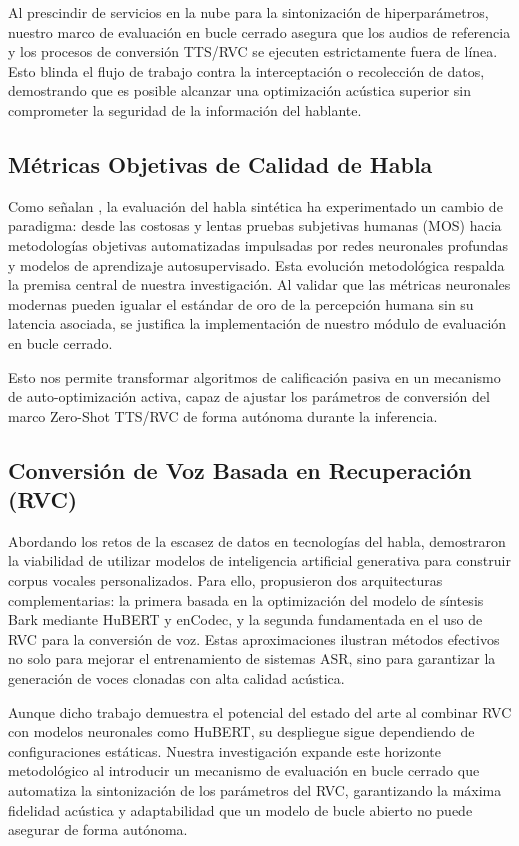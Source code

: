 \documentclass[conference]{IEEEtran}
\begin{document}
Al prescindir de servicios en la nube para la sintonización de hiperparámetros, nuestro marco de evaluación en bucle cerrado asegura que los audios de referencia y los procesos de conversión TTS/RVC se ejecuten estrictamente fuera de línea. Esto blinda el flujo de trabajo contra la interceptación o recolección de datos, demostrando que es posible alcanzar una optimización acústica superior sin comprometer la seguridad de la información del hablante.

\subsection{Métricas Objetivas de Calidad de Habla}

Como señalan \cite{cooper2024review}, la evaluación del habla sintética ha experimentado un cambio de paradigma: desde las costosas y lentas pruebas subjetivas humanas (MOS) hacia metodologías objetivas automatizadas impulsadas por redes neuronales profundas y modelos de aprendizaje autosupervisado. Esta evolución metodológica respalda la premisa central de nuestra investigación. Al validar que las métricas neuronales modernas pueden igualar el estándar de oro de la percepción humana sin su latencia asociada, se justifica la implementación de nuestro módulo de evaluación en bucle cerrado. 

Esto nos permite transformar algoritmos de calificación pasiva en un mecanismo de auto-optimización activa, capaz de ajustar los parámetros de conversión del marco Zero-Shot TTS/RVC de forma autónoma durante la inferencia.

\subsection{Conversión de Voz Basada en Recuperación (RVC)}

Abordando los retos de la escasez de datos en tecnologías del habla, \cite{kamble2023custom} demostraron la viabilidad de utilizar modelos de inteligencia artificial generativa para construir corpus vocales personalizados. Para ello, propusieron dos arquitecturas complementarias: la primera basada en la optimización del modelo de síntesis Bark mediante HuBERT y enCodec, y la segunda fundamentada en el uso de RVC para la conversión de voz. Estas aproximaciones ilustran métodos efectivos no solo para mejorar el entrenamiento de sistemas ASR, sino para garantizar la generación de voces clonadas con alta calidad acústica.

Aunque dicho trabajo demuestra el potencial del estado del arte al combinar RVC con modelos neuronales como HuBERT, su despliegue sigue dependiendo de configuraciones estáticas. Nuestra investigación expande este horizonte metodológico al introducir un mecanismo de evaluación en bucle cerrado que automatiza la sintonización de los parámetros del RVC, garantizando la máxima fidelidad acústica y adaptabilidad que un modelo de bucle abierto no puede asegurar de forma autónoma.
\end{document}
